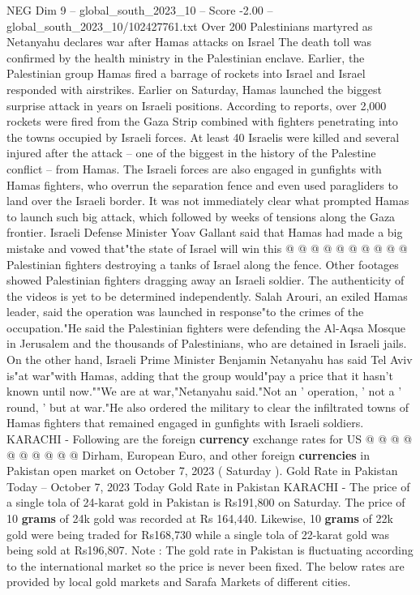 \begin{textsample}{NEG Dim 9 – global\_south\_2023\_10 – Score -2.00 – global\_south\_2023\_10/102427761.txt}  \label{ex:f9_neg_419}
Over 200 Palestinians martyred as Netanyahu declares war after Hamas attacks on Israel The death toll was confirmed by the health ministry in the Palestinian enclave.
Earlier, the Palestinian group Hamas fired a barrage of rockets into Israel and Israel responded with airstrikes.
Earlier on Saturday, Hamas launched the biggest surprise attack in years on Israeli positions.
According to reports, over 2,000 rockets were fired from the Gaza Strip combined with fighters penetrating into the towns occupied by Israeli forces.
At least 40 Israelis were killed and several injured after the attack -- one of the biggest in the history of the Palestine conflict -- from Hamas.
The Israeli forces are also engaged in gunfights with Hamas fighters, who overrun the separation fence and even used paragliders to land over the Israeli border.
It was not immediately clear what prompted Hamas to launch such big attack, which followed by weeks of tensions along the Gaza frontier.
Israeli Defense Minister Yoav Gallant said that Hamas had made a big mistake and vowed that"the state of Israel will win this @ @ @ @ @ @ @ @ @ @ Palestinian fighters destroying a tanks of Israel along the fence.
Other footages showed Palestinian fighters dragging away an Israeli soldier.
The authenticity of the videos is yet to be determined independently.
Salah Arouri, an exiled Hamas leader, said the operation was launched in response"to the crimes of the occupation."He said the Palestinian fighters were defending the Al-Aqsa Mosque in Jerusalem and the thousands of Palestinians, who are detained in Israeli jails.
On the other hand, Israeli Prime Minister Benjamin Netanyahu has said Tel Aviv is"at war"with Hamas, adding that the group would"pay a price that it hasn't known until now.""We are at war,"Netanyahu said."Not an ' operation, ' not a ' round, ' but at war."He also ordered the military to clear the infiltrated towns of Hamas fighters that remained engaged in gunfights with Israeli soldiers.
KARACHI - Following are the foreign \textbf{currency} exchange rates for US @ @ @ @ @ @ @ @ @ @ Dirham, European Euro, and other foreign \textbf{currencies} in Pakistan open market on October 7, 2023 ( Saturday ).
Gold Rate in Pakistan Today -- October 7, 2023 Today Gold Rate in Pakistan KARACHI - The price of a single tola of 24-karat gold in Pakistan is Rs191,800 on Saturday.
The price of 10 \textbf{grams} of 24k gold was recorded at Rs 164,440.
Likewise, 10 \textbf{grams} of 22k gold were being traded for Rs168,730 while a single tola of 22-karat gold was being sold at Rs196,807.
Note : The gold rate in Pakistan is fluctuating according to the international market so the price is never been fixed.
The below rates are provided by local gold markets and Sarafa Markets of different cities.

\end{textsample}
